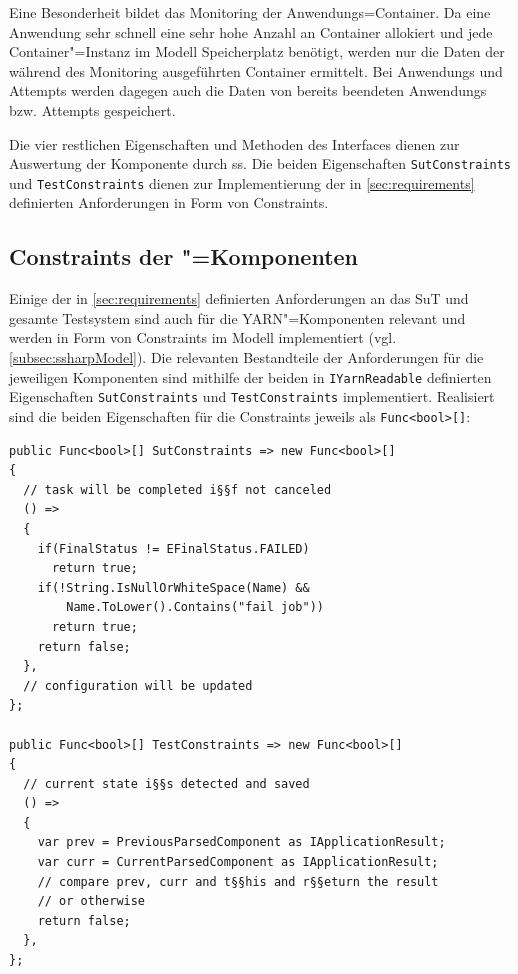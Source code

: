 Eine Besonderheit bildet das Monitoring der Anwendungs=Container.
Da eine \gls{Anwendung} sehr schnell eine sehr hohe Anzahl an \gls{Container} allokiert und jede Container"=Instanz im Modell Speicherplatz benötigt, werden nur die Daten der während des Monitoring ausgeführten \gls{Container} ermittelt.
Bei \glspl{Anwendung} und \glspl{Attempt} werden dagegen auch die Daten von bereits beendeten \glspl{Anwendung} bzw. \glspl{Attempt} gespeichert.

Die vier restlichen Eigenschaften und Methoden des Interfaces dienen zur Auswertung der Komponente durch \gls{ss}.
Die beiden Eigenschaften \texttt{SutConstraints} und \texttt{TestConstraints} dienen zur Implementierung der in \cref{sec:requirements} definierten Anforderungen in Form von Constraints.

\subsection{Constraints der "=Komponenten}
\label{subsec:yarnComponentConstraints}

Einige der in \cref{sec:requirements} definierten Anforderungen an das \gls{SuT} und gesamte Testsystem sind auch für die \gls{YARN}"=Komponenten relevant und werden in Form von Constraints im Modell implementiert (vgl. \cref{subsec:ssharpModel}).
Die relevanten Bestandteile der Anforderungen für die jeweiligen Komponenten sind mithilfe der beiden in \texttt{IYarnReadable} definierten Eigenschaften \texttt{SutConstraints} und \texttt{TestConstraints} implementiert.
Realisiert sind die beiden Eigenschaften für die Constraints jeweils als \texttt{Func<bool>[]}:

\begin{lstlisting}[label=lst:constraintDefinition,style=cs,
caption={[Definition der Constraints in YarnApp]
    Definition der Constraints in \texttt{YarnApp} (gekürzt)}]
public Func<bool>[] SutConstraints => new Func<bool>[]
{
  // task will be completed i§§f not canceled
  () =>
  {
    if(FinalStatus != EFinalStatus.FAILED)
      return true;
    if(!String.IsNullOrWhiteSpace(Name) &&
        Name.ToLower().Contains("fail job"))
      return true;
    return false;
  },
  // configuration will be updated
};

public Func<bool>[] TestConstraints => new Func<bool>[]
{
  // current state i§§s detected and saved
  () =>
  {
    var prev = PreviousParsedComponent as IApplicationResult;
    var curr = CurrentParsedComponent as IApplicationResult;
    // compare prev, curr and t§§his and r§§eturn the result
    // or otherwise
    return false;
  },
};
\end{lstlisting}

